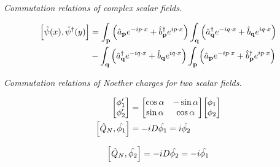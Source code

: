 \documentclass{report}
\begin{document}
\begin{subquests}
	\item \emph{Commutation relations of complex scalar fields.}
	\begin{subquests}
		\item
		\begin{align*}
			\bqty{\hat{\psi}(x),\hat{\psi}^{\dagger}(y)} & = \int_{\vb p} \pqty{\hat{a}_{\vb p}e^{-i p \cdot x} + \hat{b}^{\dagger}_{\vb p}e^{i p \cdot x}}\int_{\vb q}\pqty{\hat{a}^{\dagger}_{\vb q}e^{-i q \cdot x} + \hat{b}_{\vb q}e^{i q \cdot x}} \\
			& - \int_{\vb q}\pqty{\hat{a}^{\dagger}_{\vb q}e^{-i q \cdot x} + \hat{b}_{\vb q}e^{i q \cdot x}}		\int_{\vb p} \pqty{\hat{a}_{\vb p}e^{-i p \cdot x} + \hat{b}^{\dagger}_{\vb p}e^{i p \cdot x}}
		\end{align*}

		\item

	\end{subquests}
	
	\item \emph{Commutation relations of Noether charges for two scalar fields.}
	\begin{subquests}
		\item
		\begin{align*}
			\mqty[
				\phi_1' \\
				\phi_2' 
			]
			& = \mqty[
				\cos\alpha & -\sin\alpha \\
				\sin\alpha & \cos\alpha \\
			]\mqty[
				\phi_1 \\
				\phi_2
			] \\
			\bqty{\hat{Q}_N, \hat{\phi_1}} & = -iD\hat{\phi_1} = i\hat{\phi_2}
		\end{align*}

		\item
		\begin{gather*}
			\bqty{\hat{Q}_N, \hat{\phi_2}} = -iD\hat{\phi_2} = -i\hat{\phi_1}
		\end{gather*}
		

\end{subquests}
\end{subquests}
\end{document}
